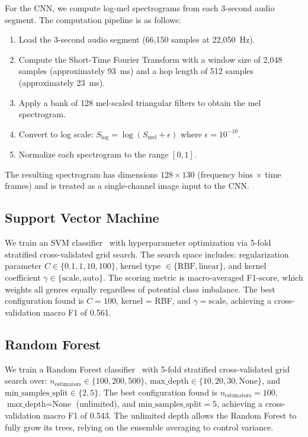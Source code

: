 \documentclass[10pt,journal]{IEEEtran}
\begin{document}
For the CNN, we compute log-mel spectrograms from each 3-second audio segment. The computation pipeline is as follows:
\begin{enumerate}
    \item Load the 3-second audio segment (66,150 samples at 22,050~Hz).
    \item Compute the Short-Time Fourier Transform with a window size of 2,048 samples (approximately 93~ms) and a hop length of 512 samples (approximately 23~ms).
    \item Apply a bank of 128 mel-scaled triangular filters to obtain the mel spectrogram.
    \item Convert to log scale: $S_{\text{log}} = \log(S_{\text{mel}} + \epsilon)$ where $\epsilon = 10^{-10}$.
    \item Normalize each spectrogram to the range $[0, 1]$.
\end{enumerate}
The resulting spectrogram has dimensions $128 \times 130$ (frequency bins $\times$ time frames) and is treated as a single-channel image input to the CNN.

\subsection{Support Vector Machine}

We train an SVM classifier~\cite{cortes1995support} with hyperparameter optimization via 5-fold stratified cross-validated grid search. The search space includes: regularization parameter $C \in \{0.1, 1, 10, 100\}$, kernel type $\in \{\text{RBF}, \text{linear}\}$, and kernel coefficient $\gamma \in \{\text{scale}, \text{auto}\}$. The scoring metric is macro-averaged F1-score, which weights all genres equally regardless of potential class imbalance. The best configuration found is $C = 100$, kernel = RBF, and $\gamma = \text{scale}$, achieving a cross-validation macro F1 of 0.561.

\subsection{Random Forest}

We train a Random Forest classifier~\cite{breiman2001random} with 5-fold stratified cross-validated grid search over: $n_{\text{estimators}} \in \{100, 200, 500\}$, $\text{max\_depth} \in \{10, 20, 30, \text{None}\}$, and $\text{min\_samples\_split} \in \{2, 5\}$. The best configuration found is $n_{\text{estimators}} = 100$, $\text{max\_depth} = \text{None}$ (unlimited), and $\text{min\_samples\_split} = 5$, achieving a cross-validation macro F1 of 0.543. The unlimited depth allows the Random Forest to fully grow its trees, relying on the ensemble averaging to control variance.
\end{document}
